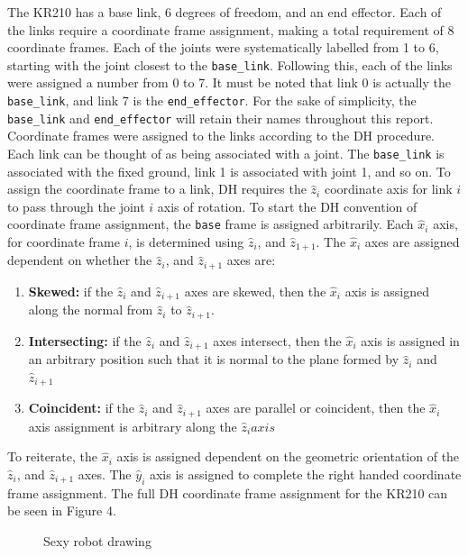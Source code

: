 \documentclass[a4paper]{article}
\begin{document}
The KR210 has a base link, 6 degrees of freedom, and an end effector. Each of the links require a coordinate frame assignment, making a total requirement of 8 coordinate frames. Each of the joints were systematically labelled from 1 to 6, starting with the joint closest to the \verb|base_link|. Following this, each of the links were assigned a number from 0 to 7. It must be noted that link 0 is actually the \verb|base_link|, and link 7 is the \verb|end_effector|. For the sake of simplicity, the \verb|base_link| and \verb|end_effector| will retain their names throughout this report. Coordinate frames were assigned to the links according to the DH procedure. Each link can be thought of as being associated with a joint. The \verb|base_link| is associated with the fixed ground, link 1 is associated with joint 1, and so on. To assign the coordinate frame to a link, DH requires the $\hat{z}_i$ coordinate axis for link $i$ to pass through the joint $i$ axis of rotation. To start the DH convention of coordinate frame assignment, the \verb|base| frame is assigned arbitrarily. Each $\hat{x}_i$ axis, for coordinate frame $i$, is determined using $\hat{z}_i$, and $\hat{z}_{1+1}$. The $\hat{x}_i$ axes are assigned dependent on whether the $\hat{z}_i$, and $\hat{z}_{i+1}$ axes are:
\begin{enumerate}
\item \textbf{Skewed:} if the $\hat{z}_i$ and $\hat{z}_{i+1}$ axes are skewed, then the $\hat{x}_i$ axis is assigned along the normal from $\hat{z}_i$ to $\hat{z}_{i+1}$.
\item \textbf{Intersecting:} if the $\hat{z}_i$ and $\hat{z}_{i+1}$ axes intersect, then the $\hat{x}_i$ axis is assigned in an arbitrary position such that it is normal to the plane formed by $\hat{z}_i$ and $\hat{z}_{i+1}$
\item \textbf{Coincident:} if the $\hat{z}_i$ and $\hat{z}_{i+1}$ axes are parallel or coincident, then the $\hat{x}_i$ axis assignment is arbitrary along the $\hat{z}_i axis$
\end{enumerate}

To reiterate, the $\hat{x}_i$ axis is assigned dependent on the geometric orientation of the $\hat{z}_i$, and $\hat{z}_{i+1}$ axes. The $\hat{y}_i$ axis is assigned to complete the right handed coordinate frame assignment. The full DH coordinate frame assignment for the KR210 can be seen in Figure 4.

\begin{figure}[h]
\centering
\scalebox{0.8}{}
\caption{Sexy robot drawing}
\end{figure}
\end{document}
